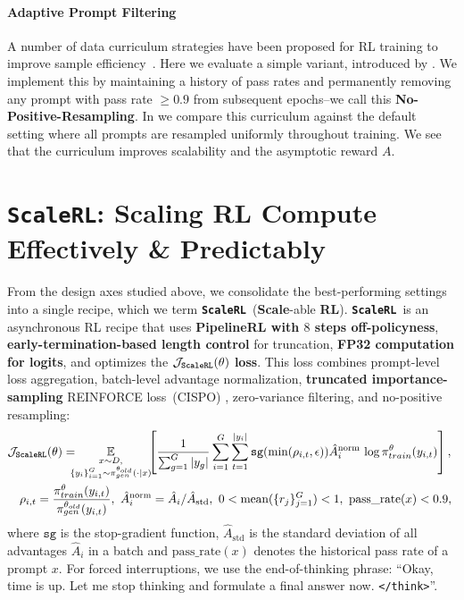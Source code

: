 \documentclass[]{fairmeta} %
\newcommand{\scalerl}{\texttt{\textbf{ScaleRL}}}
\begin{document}
\paragraph{Adaptive Prompt Filtering}

A number of data curriculum strategies have been proposed for RL training to improve sample efficiency~\citep{polaris2025,speedrl,greso}. Here we evaluate a simple variant, introduced by \citet{polaris2025}. We implement this by maintaining a history of pass rates and permanently removing any prompt with pass rate $\geq 0.9$ from subsequent epochs--we call this \textbf{No-Positive-Resampling}.
In  we compare this curriculum against the default setting where all prompts are resampled uniformly throughout training. 
We see that the curriculum improves scalability and the asymptotic reward $A$.

\section{\scalerl: Scaling RL Compute Effectively \& Predictably}
\label{sec:loo}





From the design axes studied above, we consolidate the best-performing settings into a single recipe, which we term \scalerl\ (\textbf{Scale}-able \textbf{RL}). 
\scalerl\ is an asynchronous RL recipe that uses \textbf{PipelineRL with $8$ steps off-policyness}, \textbf{early-termination-based length control} for truncation, \textbf{FP32 computation for logits}, and optimizes the $\mathbf{\mathcal{J}_{\mathrm{\scalerl}}(\theta)}$ \textbf{loss}. This loss combines prompt-level loss aggregation, batch-level advantage normalization, \textbf{truncated importance-sampling} REINFORCE loss~(CISPO) , zero-variance filtering, and no-positive resampling: 
\begin{align*}
& \mathcal{J}_{\mathrm{\scalerl}}(\theta) 
=\hspace{-0.7em} \underset{\substack{x \sim D, \\ \{y_i\}_{i=1}^G \sim \pi_{gen}^{\theta_{old}}(\cdot \mid x)}}{\mathbb{E}}
\hspace{-0.4em}
\left[ \frac{1}{\sum_{g=1}^{G} |y_g|} \sum_{i=1}^G \sum_{t=1}^{|y_i|} \texttt{sg}(\mathrm{min}(\rho_{i, t}, \epsilon)) \hat{A}_{i}^{\text{norm}} \, \log\pi_{train}^\theta(y_{i,t})\right], \\
& \quad  \rho_{i, t}=\frac{\pi_{train}^\theta(y_{i,t})}{\pi_{gen}^{\theta_{old}}(y_{i,t})},\ \hat{A}^{\mathrm{norm}}_{i}
= \hat{A}_{i}/\hat{A}_{\text{std}},\ 0 <  \mathrm{mean}(\{r_j\}_{j=1}^G) < 1,\  \text{pass\_rate}(x) < 0.9,\ 
\end{align*}
where $\texttt{sg}$ is the stop-gradient function, $\hat{A}_{\text{std}}$ is the standard deviation of all advantages $\hat{A}_{i}$ in a batch and $\text{pass\_rate}(x)$ denotes the historical pass rate of a prompt $x$.  For forced interruptions, we use the end-of-thinking phrase: ``Okay, time is up. Let me stop thinking and formulate a final answer now. \texttt{</think>}''.
\end{document}
